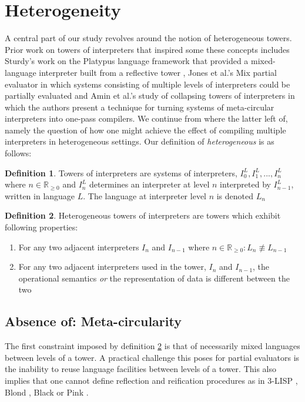 \documentclass[a4paper,12pt,twoside,openright]{report}
\theoremstyle{definition}
\newtheorem{definition}{Definition}[section]
\begin{document}
\section{Heterogeneity}\label{sec:heterogeneity}
A central part of our study revolves around the notion of heterogeneous towers. Prior work on towers of interpreters that inspired some these concepts includes Sturdy's work on the Platypus language framework that provided a mixed-language interpreter built from a reflective tower \cite{sturdy1993lisp}, Jones et al.'s Mix partial evaluator \cite{jones1989mix} in which systems consisting of multiple levels of interpreters could be partially evaluated and Amin et al.'s study of collapsing towers of interpreters in which the authors present a technique for turning systems of meta-circular interpreters into one-pass compilers. We continue from where the latter left of, namely the question of how one might achieve the effect of compiling multiple interpreters in heterogeneous settings. Our definition of \textit{heterogeneous} is as follows:
\newline
\theoremstyle{definition}
\begin{definition}
	Towers of interpreters are systems of interpreters, $I^L_0, I^L_1, ..., I^L_n$ where $n \in \mathbb R_{\ge 0}$ and $I^L_n$ determines an interpreter at level $n$ interpreted by $I^L_{n-1}$, written in language $L$. The language at interpreter level $n$ is denoted $L_n$
\end{definition}

\begin{definition}
    \label{def:het}
	Heterogeneous towers of interpreters are towers which exhibit following properties:
	\begin{enumerate}
		\item For any two adjacent interpreters $I_n$ and $I_{n-1}$ where $n \in \mathbb R_{\ge 0}: L_n \not\equiv L_{n-1}$
		\item For any two adjacent interpreters used in the tower, $I_{n}$ and $I_{n-1}$, the operational semantics \textit{or} the representation of data is different between the two
	\end{enumerate}
\end{definition}

\subsection{Absence of: Meta-circularity}
The first constraint imposed by definition \ref{def:het} is that of necessarily mixed languages between levels of a tower. A practical challenge this poses for partial evaluators is the inability to reuse language facilities between levels of a tower. This also implies that one cannot define reflection and reification procedures as in 3-LISP \cite{smith1984reflection}, Blond \cite{danvy1988intensions}, Black \cite{asai1996duplication} or Pink \cite{amin2017collapsing}.
\end{document}
